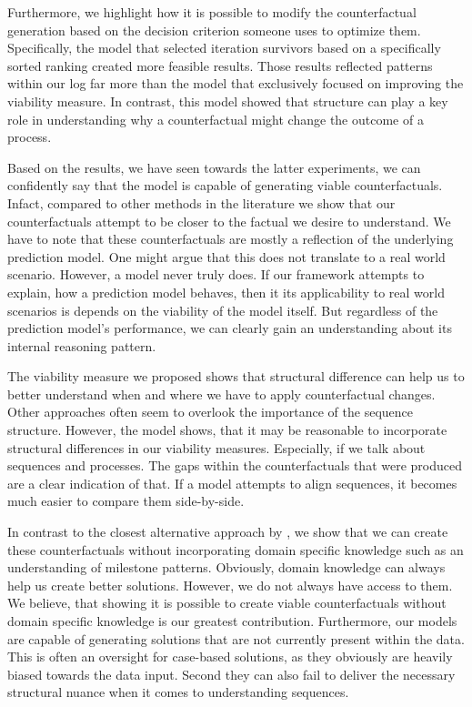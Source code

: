 \documentclass[12pt,a4paper]{report}
\begin{document}
Furthermore, we highlight how it is possible to modify the counterfactual generation based on the decision criterion someone uses to optimize them. Specifically, the model that selected iteration survivors based on a specifically sorted ranking created more feasible results. Those results reflected patterns within our log far more than the model that exclusively focused on improving the viability measure. In contrast, this model showed that structure can play a key role in understanding why a counterfactual might change the outcome of a process. 

Based on the results, we have seen towards the latter experiments, we can confidently say that the model is capable of generating viable counterfactuals. Infact, compared to other methods in the literature we show that our counterfactuals attempt to be closer to the factual we desire to understand. We have to note that these counterfactuals are mostly a reflection of the underlying prediction model. One might argue that this does not translate to a real world scenario. However, a model never truly does. If our framework attempts to explain, how a prediction model behaves, then it its applicability to real world scenarios is depends on the viability of the model itself. But regardless of the prediction model's performance, we can clearly gain an understanding about its internal reasoning pattern.

The viability measure we proposed shows that structural difference can help us to better understand when and where we have to apply counterfactual changes. Other approaches often seem to overlook the importance of the sequence structure. However, the  model shows, that it may be reasonable to incorporate structural differences in our viability measures. Especially, if we talk about sequences and processes. The gaps within the counterfactuals that were produced are a clear indication of that. If a model attempts to align sequences, it becomes much easier to compare them side-by-side.  

In contrast to the closest alternative approach by \citeauthor{hsieh_DiCE4ELInterpretingProcess_2021}, we show that we can create these counterfactuals without incorporating domain specific knowledge such as an understanding of milestone patterns. Obviously, domain knowledge can always help us create better solutions. However, we do not always have access to them. We believe, that showing it is possible to create viable counterfactuals without domain specific knowledge is our greatest contribution. Furthermore, our models are capable of generating solutions that are not currently present within the data. This is often an oversight for case-based solutions, as they obviously are heavily biased towards the data input. Second they can also fail to deliver the necessary structural nuance when it comes to understanding sequences.
\end{document}
